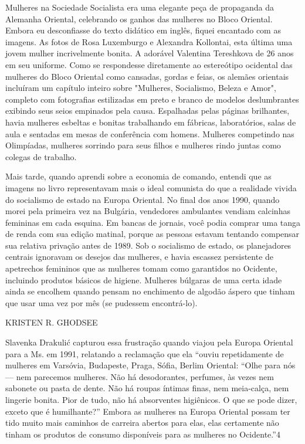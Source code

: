 Mulheres na Sociedade Socialista era uma elegante peça de propaganda da Alemanha Oriental, celebrando os ganhos das mulheres no Bloco Oriental. Embora eu desconfiasse do texto didático em inglês, fiquei encantado com as imagens. As fotos de Rosa Luxemburgo e Alexandra Kollontai, esta última uma jovem mulher incrivelmente bonita. A adorável Valentina Tereshkova de {\color{blue}26} anos em seu uniforme. Como se respondesse diretamente ao estereótipo ocidental das mulheres do Bloco Oriental como cansadas, gordas e feias, os alemães orientais incluíram um capítulo inteiro sobre "Mulheres, Socialismo, Beleza e Amor", completo com fotografias estilizadas em preto e branco de modelos deslumbrantes exibindo seus seios empinados pela causa. Espalhadas pelas páginas brilhantes, havia mulheres esbeltas e bonitas trabalhando em fábricas, laboratórios, salas de aula e sentadas em mesas de conferência com homens. Mulheres competindo nas Olimpíadas, mulheres sorrindo para seus filhos e mulheres rindo juntas como colegas de trabalho.
 \par 
Mais tarde, quando aprendi sobre a economia de comando, entendi que as imagens no livro representavam mais o ideal comunista do que a realidade vivida do socialismo de estado na Europa Oriental. No final dos anos 1990, quando morei pela primeira vez na Bulgária, vendedores ambulantes vendiam calcinhas femininas em cada esquina. Em bancas de jornais, você podia comprar uma tanga de renda com sua edição matinal, porque as pessoas estavam tentando compensar sua relativa privação antes de 1989. Sob o socialismo de estado, os planejadores centrais ignoravam os desejos das mulheres, e havia escassez persistente de apetrechos femininos que as mulheres tomam como garantidos no Ocidente, incluindo produtos básicos de higiene. Mulheres búlgaras de uma certa idade ainda se encolhem quando pensam no enchimento de algodão áspero que tinham que usar uma vez por mês (se pudessem encontrá-lo).
 \par 
KRISTEN R. GHODSEE
 \par 
Slavenka Drakulić capturou essa frustração quando viajou pela Europa Oriental para a Ms. em 1991, relatando a reclamação que ela “ouviu repetidamente de mulheres em Varsóvia, Budapeste, Praga, Sófia, Berlim Oriental: “Olhe para nós — nem parecemos mulheres. Não há desodorantes, perfumes, às vezes nem sabonete ou pasta de dente. Não há roupas íntimas finas, nem meia-calça, nem lingerie bonita. Pior de tudo, não há absorventes higiênicos. O que se pode dizer, exceto que é humilhante?” Embora as mulheres na Europa Oriental possam ter tido muito mais caminhos de carreira abertos para elas, elas certamente não tinham os produtos de consumo disponíveis para as mulheres no Ocidente.”{\color{blue}4}
